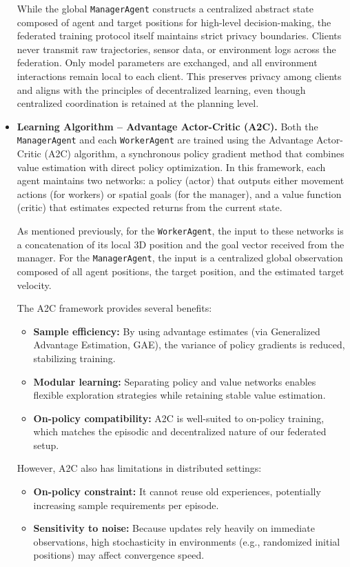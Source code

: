 \documentclass[12pt,a4paper,twoside,openany]{book}
\begin{document}
\begin{itemize}
While the global \texttt{ManagerAgent} constructs a centralized abstract state composed of agent and target positions for high-level decision-making, the federated training protocol itself maintains strict privacy boundaries. Clients never transmit raw trajectories, sensor data, or environment logs across the federation. Only model parameters are exchanged, and all environment interactions remain local to each client. This preserves privacy among clients and aligns with the principles of decentralized learning, even though centralized coordination is retained at the planning level.

\item \textbf{Learning Algorithm – Advantage Actor-Critic (A2C).}
Both the \texttt{ManagerAgent} and each \texttt{WorkerAgent} are trained using the Advantage Actor-Critic (A2C) algorithm, a synchronous policy gradient method that combines value estimation with direct policy optimization. In this framework, each agent maintains two networks: a policy (actor) that outputs either movement actions (for workers) or spatial goals (for the manager), and a value function (critic) that estimates expected returns from the current state.

As mentioned previously, for the \texttt{WorkerAgent}, the input to these networks is a concatenation of its local 3D position and the goal vector received from the manager. For the \texttt{ManagerAgent}, the input is a centralized global observation composed of all agent positions, the target position, and the estimated target velocity.

The A2C framework provides several benefits:
\begin{itemize}
    \item \textbf{Sample efficiency:} By using advantage estimates (via Generalized Advantage Estimation, GAE), the variance of policy gradients is reduced, stabilizing training.
    \item \textbf{Modular learning:} Separating policy and value networks enables flexible exploration strategies while retaining stable value estimation.
    \item \textbf{On-policy compatibility:} A2C is well-suited to on-policy training, which matches the episodic and decentralized nature of our federated setup.
\end{itemize}

However, A2C also has limitations in distributed settings:
\begin{itemize}
    \item \textbf{On-policy constraint:} It cannot reuse old experiences, potentially increasing sample requirements per episode.
    \item \textbf{Sensitivity to noise:} Because updates rely heavily on immediate observations, high stochasticity in environments (e.g., randomized initial positions) may affect convergence speed.
\end{itemize}


\end{itemize}
\end{document}
